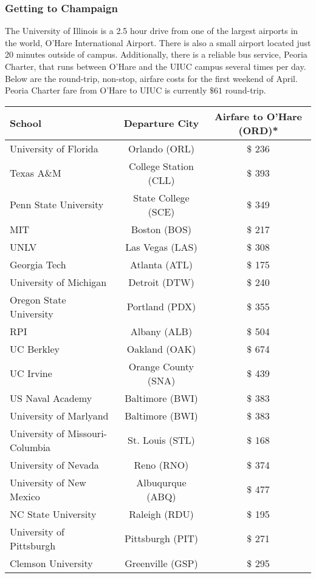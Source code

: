 \subsubsection{Getting to Champaign}
The University of Illinois is a 2.5 hour drive from one of the largest airports in the world, O'Hare International Airport. There is also a small airport located just 20 minutes outside of campus. Additionally, there is a reliable bus service, Peoria Charter, that runs between O'Hare and the UIUC campus several times per day. Below are the round-trip, non-stop, airfare costs for the first weekend of April. Peoria Charter fare from O'Hare to UIUC is currently $\$61$ round-trip.   
\begin{center}
	\begin{tabular}{lcc}
		\hline\hline
		\textbf{School} & \textbf{Departure City} & \textbf{Airfare to O'Hare (ORD)*}\\
		\hline\hline
		University of Florida & Orlando (ORL) & $\$$ 236\\
		Texas A$\&$M & College Station (CLL)& $\$$ 393\\
		Penn State University & State College (SCE) & $\$$ 349\\
		MIT & Boston (BOS) & $\$$ 217\\
		UNLV & Las Vegas (LAS) & $\$$ 308\\
		Georgia Tech & Atlanta (ATL) & $\$$ 175\\
		University of Michigan & Detroit (DTW) & $\$$ 240\\
		Oregon State University & Portland (PDX) & $\$$ 355\\
		RPI & Albany (ALB) & $\$$ 504\\
		UC Berkley & Oakland (OAK) & $\$$ 674\\
		UC Irvine & Orange County (SNA) & $\$$ 439\\
		US Naval Academy & Baltimore (BWI)& $\$$ 383\\
		University of Marlyand & Baltimore (BWI) & $\$$ 383\\
		University of Missouri-Columbia & St. Louis (STL) & $\$$ 168\\
		University of Nevada & Reno (RNO) & $\$$ 374\\
		University of New Mexico & Albuqurque (ABQ) & $\$$ 477\\
		NC State  University & Raleigh (RDU) & $\$$ 195\\
		University of Pittsburgh& Pittsburgh (PIT) & $\$$ 271\\
		Clemson University & Greenville (GSP) & $\$$ 295\\

\end{tabular}
\end{center}
